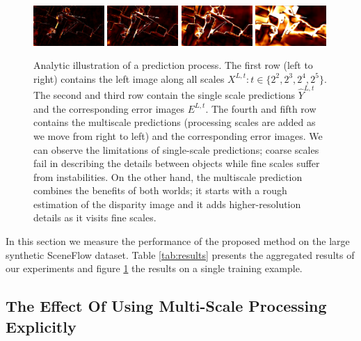 \documentclass[runningheads]{llncs}
\begin{document}
\begin{figure}[!htbp]
\begin{center}
        \includegraphics[width=0.24\textwidth,clip]{figures/pred_comb_0_err.png}
        \includegraphics[width=0.24\textwidth,clip]{figures/pred_comb_1_err.png}
        \includegraphics[width=0.24\textwidth,clip]{figures/pred_comb_2_err.png}
        \includegraphics[width=0.24\textwidth,clip]{figures/pred_comb_3_err.png}
    \end{center}
    \caption{Analytic illustration of a prediction process. The first row (left to right) contains the left image along all scales $X^{L,t} : t \in \{2^2, 2^3, 2^4, 2^5\}$. The second and third row contain the single scale predictions $\hat{Y}^{L,t}$ and the corresponding error images $E^{L,t}$. The fourth and fifth row contains the multiscale predictions (processing scales are added as we move from right to left) and the corresponding error images. We can observe the limitations of single-scale predictions; coarse scales fail in describing the details between objects while fine scales suffer from instabilities. On the other hand, the multiscale prediction combines the benefits of both worlds; it starts with a rough estimation of the disparity image and it adds higher-resolution details as it visits fine scales.}
    \label{fig:EMAPs}
\end{figure}

In this section we measure the performance of the proposed method on the large synthetic SceneFlow dataset. Table \ref{tab:results} presents the aggregated results of our experiments and figure \ref{fig:EMAPs} the results on a single training example.

\subsection{The Effect Of Using Multi-Scale Processing Explicitly}
\end{document}
